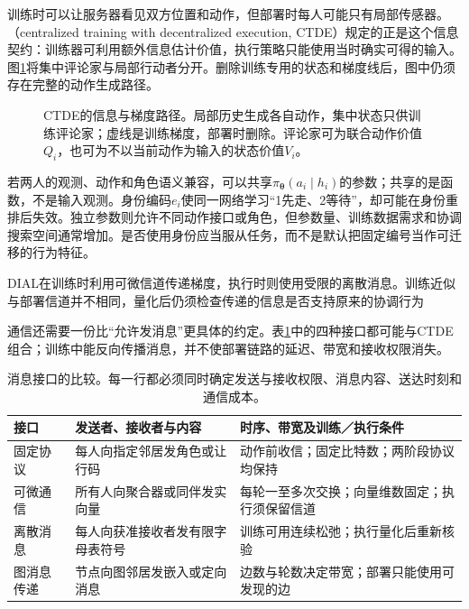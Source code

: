 训练时可以让服务器看见双方位置和动作，但部署时每人可能只有局部传感器。（centralized training with decentralized execution, CTDE）规定的正是这个信息契约：训练器可利用额外信息估计价值，执行策略只能使用当时确实可得的输入。图\ref{fig:rl-multi-agent-ctde}将集中评论家与局部行动者分开。删除训练专用的状态和梯度线后，图中仍须存在完整的动作生成路径。

\begin{figure}[htbp]
 \centering
 
 \caption{CTDE的信息与梯度路径。局部历史生成各自动作，集中状态只供训练评论家；虚线是训练梯度，部署时删除。评论家可为联合动作价值$Q_i$，也可为不以当前动作为输入的状态价值$V_i$。}
 \label{fig:rl-multi-agent-ctde}
\end{figure}

若两人的观测、动作和角色语义兼容，可以共享$\pi_{\bm\theta}(a_i\mid h_i)$的参数；共享的是函数，不是输入观测。身份编码$e_i$使同一网络学习“1先走、2等待”，却可能在身份重排后失效。独立参数则允许不同动作接口或角色，但参数量、训练数据需求和协调搜索空间通常增加。是否使用身份应当服从任务，而不是默认把固定编号当作可迁移的行为特征。

DIAL在训练时利用可微信道传递梯度，执行时则使用受限的离散消息。训练近似与部署信道并不相同，量化后仍须检查传递的信息是否支持原来的协调行为

通信还需要一份比“允许发消息”更具体的约定。表\ref{tab:rl-multi-agent-communication}中的四种接口都可能与CTDE组合；训练中能反向传播消息，并不使部署链路的延迟、带宽和接收权限消失。

\begin{table}[htbp]
 \centering
 \begin{tabularx}{\linewidth}{@{}l >{\raggedright\arraybackslash}X >{\raggedright\arraybackslash}X@{}}
 \toprule
 接口 & 发送者、接收者与内容 & 时序、带宽及训练／执行条件\\
 \midrule
 固定协议 & 每人向指定邻居发角色或让行码 & 动作前收信；固定比特数；两阶段协议均保持\\
 可微通信 & 所有人向聚合器或同伴发实向量 & 每轮一至多次交换；向量维数固定；执行须保留信道\\
 离散消息 & 每人向获准接收者发有限字母表符号 & 训练可用连续松弛；执行量化后重新核验\\
 图消息传递 & 节点向图邻居发嵌入或定向消息 & 边数与轮数决定带宽；部署只能使用可发现的边\\
 \bottomrule
 \end{tabularx}
 \caption{消息接口的比较。每一行都必须同时确定发送与接收权限、消息内容、送达时刻和通信成本。}
 \label{tab:rl-multi-agent-communication}
\end{table}

